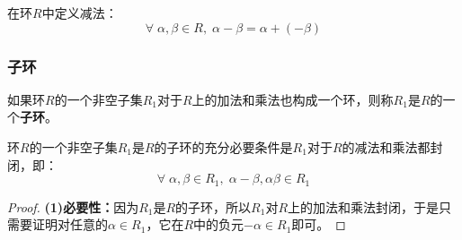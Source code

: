 \begin{definition}
	在环$R$中定义减法：
	\begin{equation*}
		\forall\;\alpha,\beta\in R,\;\alpha-\beta=\alpha+(-\beta)
	\end{equation*}
\end{definition}
\subsubsection{子环}
\begin{definition}
	如果环$R$的一个非空子集$R_1$对于$R$上的加法和乘法也构成一个环，则称$R_1$是$R$的一个\textbf{子环}。
\end{definition}
\begin{theorem}
	环$R$的一个非空子集$R_1$是$R$的子环的充分必要条件是$R_1$对于$R$的减法和乘法都封闭，即：
	\begin{equation*}
		\forall\;\alpha,\beta\in R_1,\;\alpha-\beta,\alpha\beta\in R_1
	\end{equation*}
\end{theorem}
\begin{proof}
	\textbf{(1)必要性：}因为$R_1$是$R$的子环，所以$R_1$对$R$上的加法和乘法封闭，于是只需要证明对任意的$\alpha\in R_1$，它在$R$中的负元$-\alpha\in R_1$即可。
\end{proof}